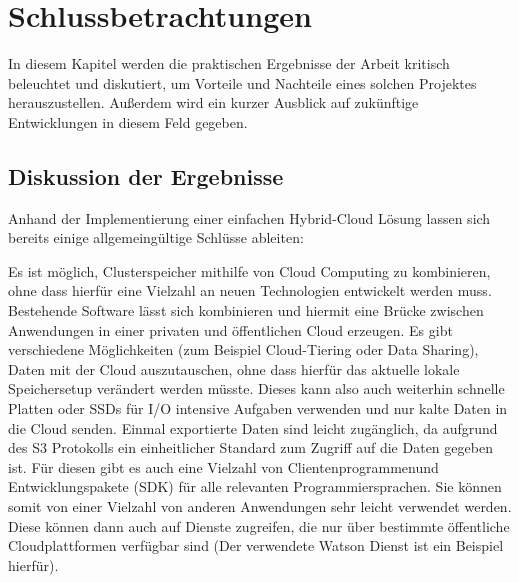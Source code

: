 \chapter{Schlussbetrachtungen}\label{ch:conclusion}

In diesem Kapitel werden die praktischen Ergebnisse der Arbeit kritisch beleuchtet und diskutiert, um Vorteile und Nachteile eines solchen Projektes herauszustellen. Außerdem wird ein kurzer Ausblick auf zukünftige Entwicklungen in diesem Feld gegeben.

\section{Diskussion der Ergebnisse}
Anhand der Implementierung einer einfachen Hybrid-Cloud Lösung lassen sich bereits einige allgemeingültige Schlüsse ableiten:

Es ist möglich, Clusterspeicher mithilfe von Cloud Computing zu kombinieren, ohne dass hierfür eine Vielzahl an neuen Technologien entwickelt werden muss. Bestehende Software lässt sich kombinieren und hiermit eine Brücke zwischen Anwendungen in einer privaten und öffentlichen Cloud erzeugen. Es gibt verschiedene Möglichkeiten (zum Beispiel Cloud-Tiering oder Data Sharing), Daten mit der Cloud auszutauschen, ohne dass hierfür das aktuelle lokale Speichersetup verändert werden müsste.
Dieses kann also auch weiterhin schnelle Platten oder \acp{SSD} für I/O intensive Aufgaben verwenden und nur kalte Daten in die Cloud senden.
Einmal exportierte Daten sind leicht zugänglich, da aufgrund des \ac{S3} Protokolls ein einheitlicher Standard zum Zugriff auf die Daten gegeben ist. Für diesen gibt es auch eine Vielzahl von Clientenprogrammenund Entwicklungspakete (SDK) für alle relevanten Programmiersprachen.
Sie können somit von einer Vielzahl von anderen Anwendungen sehr leicht verwendet werden. Diese können dann auch auf Dienste zugreifen, die nur über bestimmte öffentliche Cloudplattformen verfügbar sind (Der verwendete Watson Dienst ist ein Beispiel hierfür).

